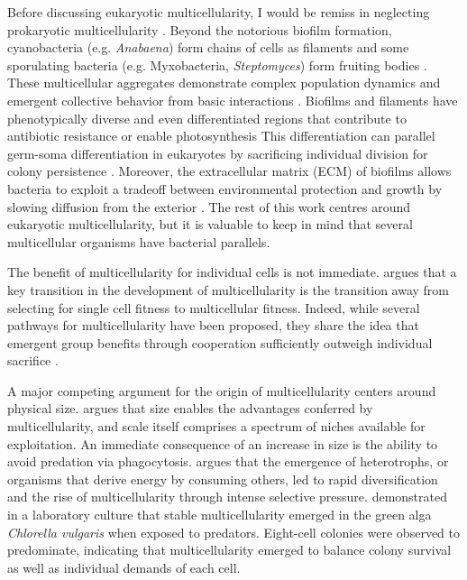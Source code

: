 Before discussing eukaryotic multicellularity, I would be remiss in neglecting prokaryotic multicellularity \citep{shapiro1988}. 
Beyond the notorious biofilm formation, cyanobacteria (e.g. \textit{Anabaena}) form chains of cells as filaments and some sporulating bacteria (e.g. Myxobacteria, \textit{Steptomyces}) form fruiting bodies \citep{claessen2014}.
These multicellular aggregates demonstrate complex population dynamics and emergent collective behavior from basic interactions \citep{lopez2010,welch2001,zhang2012}.
Biofilms and filaments have phenotypically diverse and even differentiated regions that contribute to antibiotic resistance \citep{stewart2008} or enable photosynthesis \citep{flores2010}
This differentiation can parallel germ-soma differentiation in eukaryotes by sacrificing individual division for colony persistence \citep{lewis2010,wilcox1973}.
Moreover, the extracellular matrix (ECM) of biofilms allows bacteria to exploit a tradeoff between environmental protection and growth by slowing diffusion from the exterior \citep{mah2001,rittmann1980}.
The rest of this work centres around eukaryotic multicellularity, but it is valuable to keep in mind that several multicellular organisms have bacterial parallels.

The benefit of multicellularity for individual cells is not immediate.
\citet{michod2003} argues that a key transition in the development of multicellularity is the transition away from selecting for single cell fitness to multicellular fitness. 
Indeed, while several pathways for multicellularity have been proposed, they share the idea that emergent group benefits through cooperation sufficiently outweigh individual sacrifice \citep{michod2001}.

A major competing argument for the origin of multicellularity centers around physical size. 
\citet{bonner1998} argues that size enables the advantages conferred by multicellularity, and scale itself comprises a spectrum of niches available for exploitation.
An immediate consequence of an increase in size is the ability to avoid predation via phagocytosis.
\citet{stanley1973} argues that the emergence of heterotrophs, or organisms that derive energy by consuming others, led to rapid diversification and the rise of multicellularity through intense selective pressure. 
\citet{boraas1998} demonstrated in a laboratory culture that stable multicellularity emerged in the green alga \textit{Chlorella vulgaris} when exposed to predators.
Eight-cell colonies were observed to predominate, indicating that multicellularity emerged to balance colony survival as well as individual demands of each cell.

